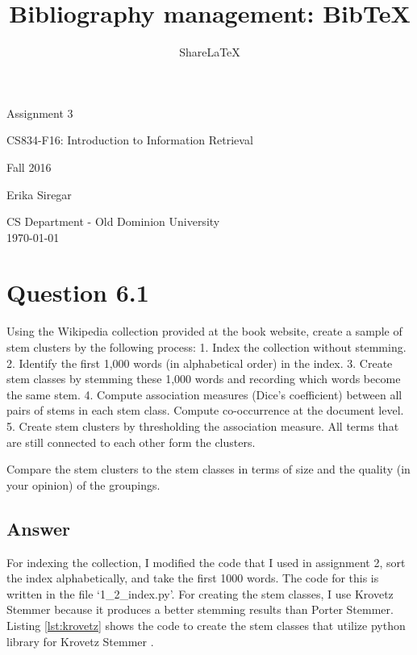 \documentclass[letterpaper,11pt]{article}
\title{Bibliography management: BibTeX}
\author{Share\LaTeX}
\begin{document}
\begin{titlepage}

\begin{center}

\Huge{Assignment 3}

\Large{CS834-F16:  Introduction to Information Retrieval}

\Large{Fall 2016}


\Large{Erika Siregar}

\vfill

\Large{CS Department - Old Dominion University  \\ \today}


\end{center}

\end{titlepage}


\section*{Question 6.1}
\begin{spverbatim}
Using the Wikipedia collection provided at the book website, create a sample of stem clusters by the following process:
1. Index the collection without stemming.
2. Identify the first 1,000 words (in alphabetical order) in the index.
3. Create stem classes by stemming these 1,000 words and recording which words become the same stem.
4. Compute association measures (Dice’s coefficient) between all pairs of stems in each stem class. Compute co-occurrence at the document level.
5. Create stem clusters by thresholding the association measure. All terms that are still connected to each other form the clusters.

Compare the stem clusters to the stem classes in terms of size and the quality (in your opinion) of the groupings.
\end{spverbatim}

\subsection*{Answer}
For indexing the collection, I modified the code that I used in assignment 2, sort the index alphabetically, and take the first 1000 words. The code for this is written in the file `1\_2\_index.py'. For creating the stem classes, I use Krovetz Stemmer because it produces a better stemming results than Porter Stemmer. Listing \ref{lst:krovetz} shows the code to create the stem classes that utilize python library for Krovetz Stemmer \cite{krovetz-python}.
\end{document}
